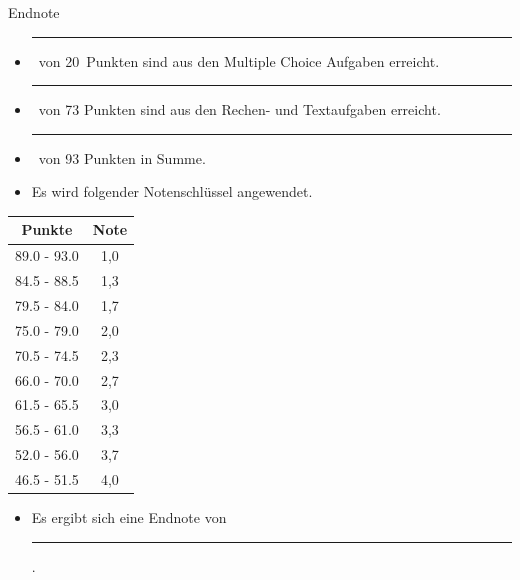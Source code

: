 \documentclass[a4paper, 9pt]{scrartcl}\usepackage[]{graphicx}\usepackage[]{xcolor}
\begin{document}
\begin{graybox}{Endnote}
  \vspace{1Ex}
  \begin{itemize}
  \item[] \rule[0ex]{3em}{.4pt}\, von 20\, Punkten sind aus den Multiple
    Choice Aufgaben erreicht.
  \item[] \rule[0ex]{3em}{.4pt}\, von 73 Punkten sind aus den Rechen- und
    Textaufgaben erreicht. 
  \item[] \rule[0ex]{3em}{.4pt}\, von 93 Punkten in Summe.
  \item[] Es wird folgender Notenschlüssel angewendet.   
  \end{itemize}
  \vspace{1ex}
\begin{center}
  \begin{tabular}[c]{cc}
    \toprule
    \textbf{Punkte}	&	\textbf{Note}	\\
    \midrule
    89.0 - 93.0	&	1,0	\\
    84.5 - 88.5	&	1,3	\\
    79.5 - 84.0	&	1,7	\\
    75.0 - 79.0	&	2,0	\\
    70.5 - 74.5	&	2,3	\\
    66.0 - 70.0	&	2,7	\\
    61.5 - 65.5	&	3,0	\\
    56.5 - 61.0	&	3,3	\\
    52.0 - 56.0	&	3,7	\\
    46.5 - 51.5	&	4,0	\\
    \bottomrule
  \end{tabular}
\end{center}
  \vspace{1ex}
\begin{itemize}
\item[] Es ergibt sich eine Endnote von \rule[0ex]{4em}{.4pt}.
\end{itemize}
  \vspace{1Ex}
\end{graybox}

\newpage
\end{document}
